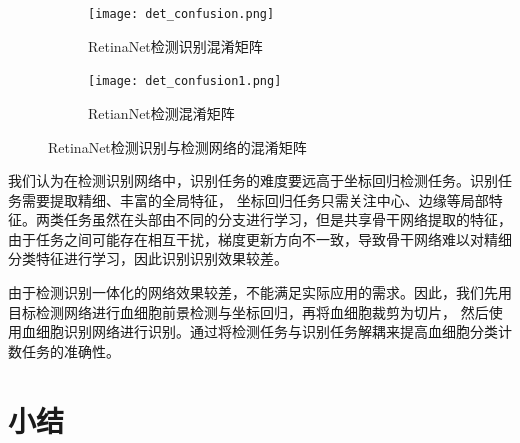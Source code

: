 \begin{table}   
  \caption{RetinaNet网络各类别的准确率与召回率}      
  \centering    
  \label{table:cell_cls}
  \centering  
\end{table}

\begin{figure}[htbp]                  
  \centering                   
	\begin{subfigure}{0.48\linewidth}
		\centering
    \texttt{[image: det\_confusion.png]}                   
    \caption{RetinaNet检测识别混淆矩阵}
	\end{subfigure}
	\begin{subfigure}{0.48\linewidth}
		\centering
		\texttt{[image: det\_confusion1.png]}
    \caption{RetianNet检测混淆矩阵}
	\end{subfigure}
  \caption{RetinaNet检测识别与检测网络的混淆矩阵}                   
  \label{fig:det_confusion}      
\end{figure}   

我们认为在检测识别网络中，识别任务的难度要远高于坐标回归检测任务。识别任务需要提取精细、丰富的全局特征，
坐标回归任务只需关注中心、边缘等局部特征。两类任务虽然在头部由不同的分支进行学习，但是共享骨干网络提取的特征，
由于任务之间可能存在相互干扰，梯度更新方向不一致，导致骨干网络难以对精细分类特征进行学习，因此识别识别效果较差。

 由于检测识别一体化的网络效果较差，不能满足实际应用的需求。因此，我们先用目标检测网络进行血细胞前景检测与坐标回归，再将血细胞裁剪为切片，
 然后使用血细胞识别网络进行识别。通过将检测任务与识别任务解耦来提高血细胞分类计数任务的准确性。
 

\section{小结}


